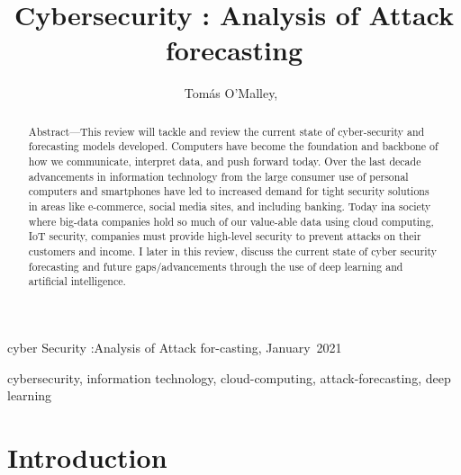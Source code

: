 \documentclass[journal]{IEEEtran}
\begin{document}
{cyber Security :Analysis of  Attack for-casting, January~2021}

\title{Cybersecurity : Analysis of  Attack forecasting}
\author{Tomás O'Malley,~%
}

\maketitle

\begin{abstract}
Abstract—This review will tackle and review the current state of cyber-security and forecasting models developed. Computers have become the foundation and backbone of how we communicate, interpret data, and push forward today. Over the last decade advancements in information technology from the large consumer use of personal computers and smartphones have led to increased demand for tight security solutions in areas like e-commerce, social media sites, and including banking. Today ina society where big-data companies hold so much of our value-able data using cloud computing, IoT security, companies must provide high-level security to prevent attacks on their customers and income. I later in this review, discuss the current state of cyber security forecasting and future gaps/advancements through the use of deep learning and artificial intelligence.



\end{abstract}
\begin{IEEEkeywords}
cybersecurity, information  technology, cloud-computing, attack-forecasting, deep learning

\end{IEEEkeywords}

\section{Introduction}
\end{document}
